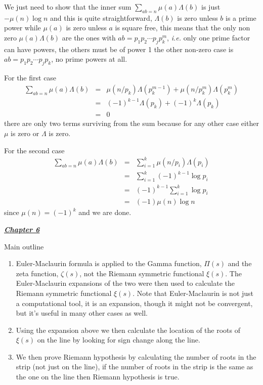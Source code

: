\documentclass[aps,preprint,preprintnumbers,nofootinbib,showpacs,prd]{revtex4-1}
\newcommand{\ie}{{\it i.e.} }
\newcommand{\nbea}{\begin{eqnarray*}}
\newcommand{\neea}{\end{eqnarray*}}
\begin{document}
We just need to show that the inner sum $\sum_{ab=n} \mu(a) \Lambda(b)$ is just $-\mu(n)\log n$ and this is quite straightforward, $\Lambda(b)$ is zero unless $b$ is a prime power while $\mu(a)$ is zero unless $a$ is square free, this means that the only non zero $\mu(a)\Lambda(b)$ are the ones with $ab = p_1 p_2 \cdots p_j p_k^m$, \ie only one prime factor can have powers, the others must be of power 1 the other non-zero case is $ab = p_1 p_2 \cdots p_j p_k$, no prime powers at all.

For the first case
%
\nbea
\sum_{ab=n} \mu(a) \Lambda(b) & = & \mu(n/p_k) \Lambda(p_k^{m-1}) + \mu(n/p_k^m) \Lambda(p_k^m) \\
& = & (-1)^{k-1} \Lambda(p_k) + (-1)^{k} \Lambda(p_k) \\
& = & 0
\neea
%
there are only two terms surviving from the sum because for any other case either $\mu$ is zero or $\Lambda$ is zero.

For the second case
%
\nbea
\sum_{ab=n} \mu(a) \Lambda(b) & = & \sum_{i=1}^k \mu(n/p_i)\Lambda(p_i) \\
& = & \sum_{i=1}^k (-1)^{k-1} \log p_i \\
& = & (-1)^{k-1} \sum_{i=1}^k \log p_i \\
& = & (-1) \mu(n) \log n
\neea
%
since $\mu(n) = (-1)^{k}$ and we are done.

\bigskip
\underline{\textbf{\textit{Chapter 6}}}
\bigskip

Main outline
%
\begin{enumerate}
\item Euler-Maclaurin formula is applied to the Gamma function, $\Pi(s)$ and the zeta function, $\zeta(s)$, not the Riemann symmetric functional $\xi(s)$. The Euler-Maclaurin expansions of the two were then used to calculate the Riemann symmetric functional $\xi(s)$. Note that Euler-Maclaurin is not just a computational tool, it is an expansion, though it might not be convergent, but it's useful in many other cases as well.
%
\item Using the expansion above we then calculate the location of the roots of $\xi(s)$ on the line by looking for sign change along the line.
%
\item We then prove Riemann hypothesis by calculating the number of roots in the strip (not just on the line), if the number of roots in the strip is the same as the one on the line then Riemann hypothesis is true.
\end{enumerate}
%
\end{document}
